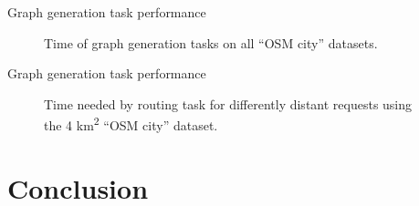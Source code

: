 \documentclass[xcolor={x11names}]{beamer}
\newenvironment{figcenter}
{%
	\parskip=0pt%
	\par%
	\nopagebreak%
	\centering%
}%
{%
	\par%
	\noindent%
	\ignorespacesafterend%
}
\begin{document}

		\begin{frame}{Graph generation task performance}
			\begin{figure}
				\begin{figcenter}
					\hspace*{-0.35cm}
					\scalebox{0.7}
					{
						
					}
				\end{figcenter}
				\caption{Time of graph generation tasks on all \enquote{OSM city} datasets.}
			\end{figure}
		\end{frame}
		
		\begin{frame}{Graph generation task performance}
			\begin{figure}
				\begin{figcenter}
					\hspace*{-0.35cm}
					\scalebox{0.7}
					{
						
					}
				\end{figcenter}
				\caption{Time needed by routing task for differently distant requests using the 4 km\textsuperscript{2} \enquote{OSM city} dataset.}
			\end{figure}
		\end{frame}
	
	\section{Conclusion}
\end{document}
